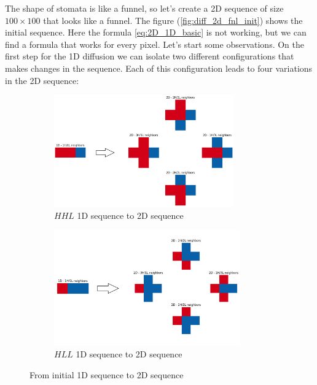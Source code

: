 The shape of stomata is like a funnel, so let's create a 2D sequence of size $100 
\times 100$ that looks like a funnel. The figure (\ref{fig:diff_2d_fnl_init}) shows the 
initial sequence. Here the formula \eqref{eq:2D_1D_basic} is not working, but we can find
a formula that works for every pixel. Let's start some observations. On the first step 
for the 1D diffusion we can isolate two different configurations that makes changes in 
the sequence. Each of this configuration leads to four variations in the 2D sequence:

\begin{figure}[h]
    \centering
    \begin{subfigure}[b]{1\textwidth}
        \centering
        \includegraphics[width=0.85\textwidth]{figures/HHL_1D_to_2D.png}
        \caption{$HHL$ 1D sequence to 2D sequence}
        \label{fig:HHL_1D_to_2D}
    \end{subfigure}
    \hfill
    \begin{subfigure}[b]{1\textwidth}
        \centering
        \includegraphics[width=0.88\textwidth]{figures/HLL_1D_to_2D.png}
        \caption{$HLL$ 1D sequence to 2D sequence}
        \label{fig:HLL_1D_to_2D}
    \end{subfigure}
    \caption{From initial 1D sequence to 2D sequence}
    \label{fig:1D_to_2D}
\end{figure}

